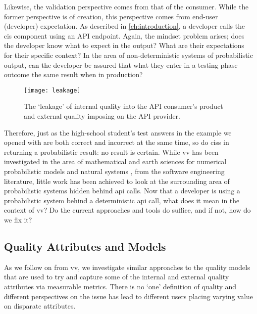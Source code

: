 Likewise, the validation perspective comes from that of the consumer. While the former perspective is of creation, this perspective comes from end-user (developer) expectation. As described in \cref{ch:introduction}, a developer calls the \gls{cis} component using an API endpoint. Again, the mindset problem arises; does the developer know what to expect in the output? What are their expectations for their specific context? In the area of non-deterministic systems of probabilistic output, can the developer be assured that what they enter in a testing phase outcome the same result when in production?

\begin{figure}[hbt]
  \centering
  \texttt{[image: leakage]}
  \caption[Leakage of internal and external quality in CISs]{The `leakage' of internal quality into the API consumer's product and external quality imposing on the API provider.}
  \label{fig:lit-review:software-quality:v-and-v:leakage}
\end{figure}

Therefore, just as the high-school student's test answers in the example we opened with are both correct and incorrect at the same time, so do \glspl{cis} in returning a probabilistic result: no result is certain. While \gls{vv} has been investigated in the area of mathematical and earth sciences for numerical probabilistic models and natural systems \citep{Oreskes:1994gn,Rutten:2004a}, from the software engineering literature, little work has been achieved to look at the surrounding area of probabilistic systems hidden behind \gls{api} calls. Now that a developer is using  a probabilistic system behind a deterministic \gls{api} call, what does it mean in the context of \gls{vv}? Do the current approaches and tools do suffice, and if not, how do we fix it?

\subsection{Quality Attributes and Models}

As we follow on from \gls{vv}, we investigate similar approaches to the quality models that are used to try and capture some of the internal and external quality attributes via measurable metrics. There is no `one' definition of quality and different perspectives on the issue has lead to different users placing varying value on disparate attributes.

